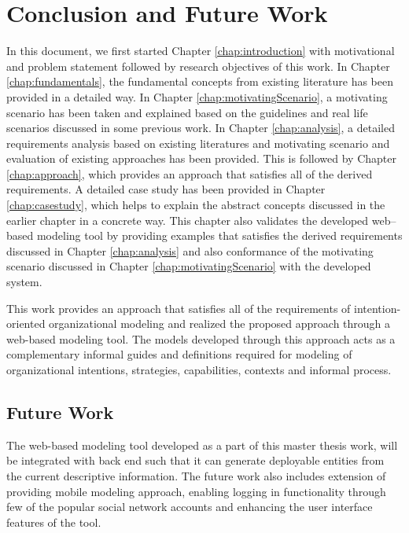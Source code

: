 \chapter{Conclusion and Future Work}
\label{chap:conclusion}

In this document, we first started Chapter \ref{chap:introduction} with motivational and problem statement followed by research objectives of this work. In Chapter \ref{chap:fundamentals}, the fundamental concepts from existing literature has been provided in a detailed way. In Chapter \ref{chap:motivatingScenario}, a motivating scenario has been taken and explained based on the guidelines and real life scenarios discussed in some previous work. In Chapter \ref{chap:analysis}, a detailed requirements analysis based on existing literatures and motivating scenario and evaluation of existing approaches has been provided. This is followed by Chapter \ref{chap:approach}, which provides an approach that satisfies all of the derived requirements. A detailed case study has been provided in Chapter \ref{chap:casestudy}, which helps to explain the abstract concepts discussed in the earlier chapter in a concrete way. This chapter also validates the developed web–based modeling tool by providing examples that satisfies the derived requirements discussed in Chapter \ref{chap:analysis} and also conformance of the motivating scenario discussed in Chapter \ref{chap:motivatingScenario} with the developed system.

This work provides an approach that satisfies all of the requirements of intention-oriented organizational modeling and realized the proposed approach through a web-based modeling tool. The models developed through this approach acts as a complementary informal guides and definitions required for modeling of organizational intentions, strategies, capabilities, contexts and informal process. 

\section*{Future Work}
\label{sec:futurework}
The web-based modeling tool developed as a part of this master thesis work, will be integrated with back end such that it can generate deployable entities from the current descriptive information. The future work also includes extension of providing mobile modeling approach, enabling logging in functionality through few of the popular social network accounts and enhancing the user interface features of the tool. 





